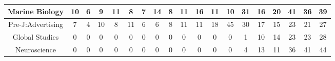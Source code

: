 \documentclass[10pt]{article}
\begin{document}
\begin{landscape}
\begin{longtable}[c]{|ccccccccccccccccccc|}
	\multicolumn{1}{|c|}{Marine Biology}                             & \multicolumn{1}{c|}{10}         & \multicolumn{1}{c|}{6}          & \multicolumn{1}{c|}{9}          & \multicolumn{1}{c|}{11}         & \multicolumn{1}{c|}{8}          & \multicolumn{1}{c|}{7}          & \multicolumn{1}{c|}{14}         & \multicolumn{1}{c|}{8}          & \multicolumn{1}{c|}{11}         & \multicolumn{1}{c|}{16}         & \multicolumn{1}{c|}{11}         & \multicolumn{1}{c|}{10}         & \multicolumn{1}{c|}{31}         & \multicolumn{1}{c|}{16}         & \multicolumn{1}{c|}{20}         & \multicolumn{1}{c|}{41}         & \multicolumn{1}{c|}{36}         & 39         \\ \hline
	\multicolumn{1}{|c|}{Pre-J:Advertising}                          & \multicolumn{1}{c|}{7}          & \multicolumn{1}{c|}{4}          & \multicolumn{1}{c|}{10}         & \multicolumn{1}{c|}{8}          & \multicolumn{1}{c|}{11}         & \multicolumn{1}{c|}{6}          & \multicolumn{1}{c|}{6}          & \multicolumn{1}{c|}{8}          & \multicolumn{1}{c|}{11}         & \multicolumn{1}{c|}{11}         & \multicolumn{1}{c|}{18}         & \multicolumn{1}{c|}{45}         & \multicolumn{1}{c|}{30}         & \multicolumn{1}{c|}{17}         & \multicolumn{1}{c|}{15}         & \multicolumn{1}{c|}{23}         & \multicolumn{1}{c|}{21}         & 27         \\ \hline
	\multicolumn{1}{|c|}{Global Studies}                             & \multicolumn{1}{c|}{0}          & \multicolumn{1}{c|}{0}          & \multicolumn{1}{c|}{0}          & \multicolumn{1}{c|}{0}          & \multicolumn{1}{c|}{0}          & \multicolumn{1}{c|}{0}          & \multicolumn{1}{c|}{0}          & \multicolumn{1}{c|}{0}          & \multicolumn{1}{c|}{0}          & \multicolumn{1}{c|}{0}          & \multicolumn{1}{c|}{0}          & \multicolumn{1}{c|}{0}          & \multicolumn{1}{c|}{1}          & \multicolumn{1}{c|}{10}         & \multicolumn{1}{c|}{14}         & \multicolumn{1}{c|}{23}         & \multicolumn{1}{c|}{23}         & 28         \\ \hline
	\multicolumn{1}{|c|}{Neuroscience}                               & \multicolumn{1}{c|}{0}          & \multicolumn{1}{c|}{0}          & \multicolumn{1}{c|}{0}          & \multicolumn{1}{c|}{0}          & \multicolumn{1}{c|}{0}          & \multicolumn{1}{c|}{0}          & \multicolumn{1}{c|}{0}          & \multicolumn{1}{c|}{0}          & \multicolumn{1}{c|}{0}          & \multicolumn{1}{c|}{0}          & \multicolumn{1}{c|}{0}          & \multicolumn{1}{c|}{0}          & \multicolumn{1}{c|}{4}          & \multicolumn{1}{c|}{13}         & \multicolumn{1}{c|}{11}         & \multicolumn{1}{c|}{36}         & \multicolumn{1}{c|}{41}         & 44         \\ \hline

\end{longtable}
\end{landscape}
\end{document}
